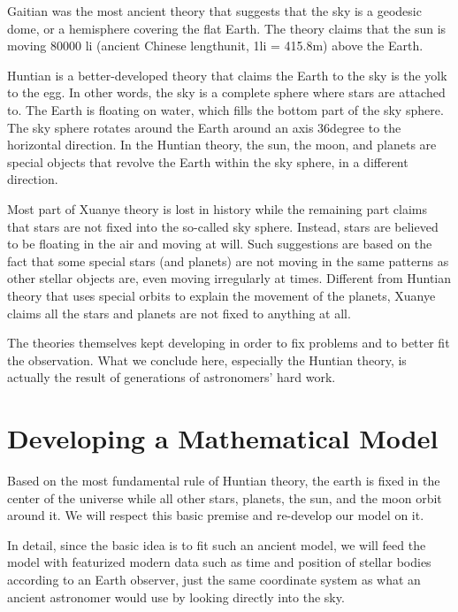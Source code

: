 \documentclass{article}
\begin{document}
Gaitian was the most ancient theory that suggests that the sky is a geodesic dome, or a hemisphere covering the flat Earth. The theory claims that the sun is moving 80000 li (ancient Chinese lengthunit, 1li = 415.8m) above the Earth.

Huntian is a better-developed theory that claims the Earth to the sky is the yolk to the egg. In other words, the sky is a complete sphere where stars are attached to. The Earth is floating on water, which fills the bottom part of the sky sphere. The sky sphere rotates around the Earth around an axis 36degree to the horizontal direction. In the Huntian theory, the sun, the moon, and planets are special objects that revolve the Earth within the sky sphere, in a different direction.

Most part of Xuanye theory is lost in history while the remaining part claims that stars are not fixed into the so-called sky sphere. Instead, stars are believed to be floating in the air and moving at will. Such suggestions are based on the fact that some special stars (and planets) are not moving in the same patterns as other stellar objects are, even moving irregularly at times. Different from Huntian theory that uses special orbits to explain the movement of the planets, Xuanye claims all the stars and planets are not fixed to anything at all.

The theories themselves kept developing in order to fix problems and to better fit the observation. What we conclude here, especially the Huntian theory, is actually the result of generations of astronomers' hard work.

\section{Developing a Mathematical Model}
Based on the most fundamental rule of Huntian theory, the earth is fixed in the center of the universe while all other stars, planets, the sun, and the moon orbit around it. We will respect this basic premise and re-develop our model on it.

In detail, since the basic idea is to fit such an ancient model, we will feed the model with featurized modern data such as time and position of stellar bodies according to an Earth observer, just the same coordinate system as what an ancient astronomer would use by looking directly into the sky.

\end{document}
